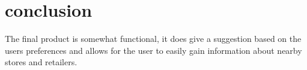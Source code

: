 \section{conclusion}
\label{sec:conc}

The final product is somewhat functional, it does give a suggestion based on the users preferences and allows for the user to easily gain information about nearby stores and retailers.

